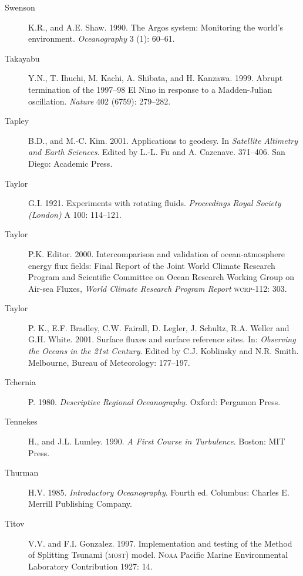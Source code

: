 \begin{description}
\item [Swenson]K.R., and A.E. Shaw. 1990. The Argos system: Monitoring
  the world's environment. \textit{Oceanography} 3 (1): 60--61.

\item [Takayabu]Y.N., T. Ihuchi, M. Kachi, A. Shibata, and
  H. Kanzawa. 1999. Abrupt termination of the 1997--98 El Nino in
  response to a Madden-Julian oscillation. \textit{Nature} 402 (6759):
  279--282.

\item [Tapley]B.D., and M.-C. Kim. 2001. Applications to geodesy. In
  \textit{Satellite Altimetry and Earth Sciences}. Edited by L.-L. Fu
  and A.  Cazenave. 371--406. San Diego: Academic Press.

\item [Taylor]G.I. 1921. Experiments with rotating
  fluids. \textit{Proceedings Royal Society (London)} A 100: 114--121.

\item [Taylor]P.K. Editor. 2000. Intercomparison and validation of
  ocean-atmosphere energy flux fields: Final Report of the Joint World
  Climate Research Program and Scientific Committee on Ocean Research
  Working Group on Air-sea Fluxes, \textit{World Climate Research
    Program Report} \textsc{wcrp}-112: 303.
	
\item [Taylor]P. K., E.F. Bradley, C.W. Fairall, D. Legler,
  J. Schultz, R.A. Weller and G.H. White. 2001. Surface fluxes and
  surface reference sites. In: \textit{Observing the Oceans in the
    21st Century}. Edited by C.J. Koblinsky and N.R. Smith. Melbourne,
  Bureau of Meteorology: 177--197.

\item [Tchernia]P. 1980. \textit{Descriptive Regional
  Oceanography}. Oxford: Pergamon Press.

\item [Tennekes]H., and J.L. Lumley. 1990. \textit{A First Course in
  Turbulence}.  Boston: MIT Press.

\item [Thurman]H.V. 1985. \textit{Introductory Oceanography}. Fourth
  ed. Columbus: Charles E. Merrill Publishing Company.

\item [Titov]V.V. and F.I. Gonzalez. 1997. Implementation and testing
  of the Method of Splitting Tsunami (\textsc{most})
  model. \textsc{Noaa} Pacific Marine Environmental Laboratory
  Contribution 1927: 14.


\end{description}

